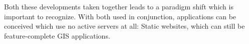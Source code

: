 Both these developments taken together leads to a 
paradigm shift which is important to recognize.
With both used in conjunction, applications can be conceived which use no active servers at all: Static websites, which can still be feature-complete \ac{GIS} applications.














